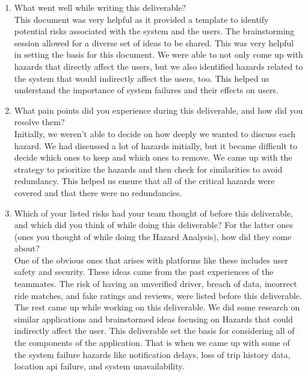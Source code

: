 \documentclass{article}
\begin{document}



\begin{enumerate}
    \item What went well while writing this deliverable? \\
    This document was very helpful as it provided a template to identify potential risks associated with the system and the users. The brainstorming session allowed for a diverse set of ideas to be shared. This was very helpful in setting the basis for this document. We were able to not only come up with hazards that directly affect the users, but we also identified hazards related to the system that would indirectly affect the users, too. This helped us understand the importance of system failures and their effects on users.
    
    \item What pain points did you experience during this deliverable, and how
    did you resolve them?\\
    Initially, we weren't able to decide on how deeply we wanted to discuss each hazard. We had discussed a lot of hazards initially, but it became difficult to decide which ones to keep and which ones to remove. We came up with the strategy to prioritize the hazards and then check for similarities to avoid redundancy. This helped us ensure that all of the critical hazards were covered and that there were no redundancies.
    
    \item Which of your listed risks had your team thought of before this
    deliverable, and which did you think of while doing this deliverable? For
    the latter ones (ones you thought of while doing the Hazard Analysis), how
    did they come about?\\
    One of the obvious ones that arises with platforms like these includes user safety and security. These ideas came from the past experiences of the teammates. The risk of having an unverified driver, breach of data, incorrect ride matches, and fake ratings and reviews, were listed before this deliverable. The rest came up while working on this deliverable. We did some research on similar applications and brainstormed ideas focusing on Hazards that could indirectly affect the user. This deliverable set the basis for considering all of the components of the application. That is when we came up with some of the system failure hazards like notification delays, loss of trip history data, location api failure, and system unavailability.   
    

\end{enumerate}
\end{document}

